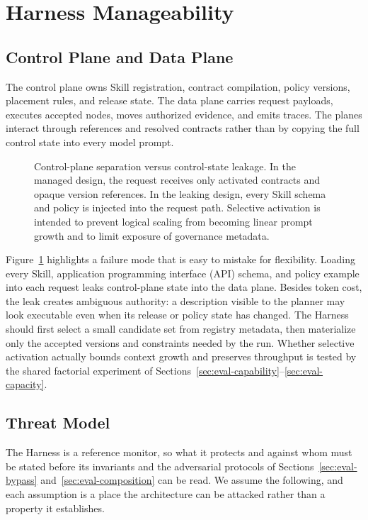 \section{Harness Manageability}
\label{sec:manageability}

\subsection{Control Plane and Data Plane}

The control plane owns Skill registration, contract compilation, policy versions, placement rules, and release state. The data plane carries request payloads, executes accepted nodes, moves authorized evidence, and emits traces. The planes interact through references and resolved contracts rather than by copying the full control state into every model prompt.

\begin{figure}[t]
\centering
\caption{Control-plane separation versus control-state leakage. In the managed design, the request receives only activated contracts and opaque version references. In the leaking design, every Skill schema and policy is injected into the request path. Selective activation is intended to prevent logical scaling from becoming linear prompt growth and to limit exposure of governance metadata.}
\label{fig:control-data}
\end{figure}

Figure~\ref{fig:control-data} highlights a failure mode that is easy to mistake for flexibility. Loading every Skill, application programming interface (API) schema, and policy example into each request leaks control-plane state into the data plane. Besides token cost, the leak creates ambiguous authority: a description visible to the planner may look executable even when its release or policy state has changed. The Harness should first select a small candidate set from registry metadata, then materialize only the accepted versions and constraints needed by the run. Whether selective activation actually bounds context growth and preserves throughput is tested by the shared factorial experiment of Sections~\ref{sec:eval-capability}--\ref{sec:eval-capacity}.

\subsection{Threat Model}
\label{sec:threat-model}

The Harness is a reference monitor, so what it protects and against whom must be stated
before its invariants and the adversarial protocols of
Sections~\ref{sec:eval-bypass} and~\ref{sec:eval-composition} can be read. We assume the
following, and each assumption is a place the architecture can be attacked rather than a
property it establishes.

